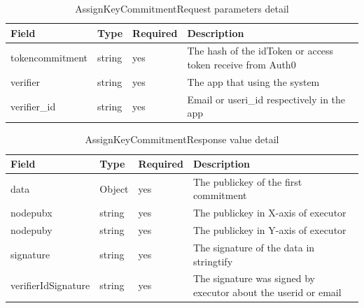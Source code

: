 \documentclass[../Main.tex]{subfiles}
\begin{document}
\begin{table}[H]
  \centering
  \begin{tabular}{|l|l|l|p{8cm}|}
\hline
\rowcolor[HTML]{F56B00} 
\textbf{Field}  & \textbf{Type} & \textbf{Required} & \textbf{Description}                                                    \\ \hline
tokencommitment & string        & yes               & The hash of the idToken or access token receive from Auth0             \\ \hline
verifier        & string        & yes               & The app that using the system\\ \hline
verifier\_id         & string        & yes               & Email or useri\_id respectively in the app\\ \hline
\end{tabular}
  \caption{AssignKeyCommitmentRequest parameters detail}
  \label{assignkey-commitment-request-params-detail}
\end{table}

\begin{table}[H]
  \centering
\begin{tabular}{|l|l|l|l|}
\hline
\rowcolor[HTML]{F56B00} 
\textbf{Field}      & \textbf{Type} & \textbf{Required} & \textbf{Description}                                           \\ \hline
data                & Object        & yes               & The publickey of the first commitment                          \\ \hline
nodepubx            & string        & yes               & The publickey in X-axis of executor                            \\ \hline
nodepuby            & string        & yes               & The publickey in Y-axis of executor                            \\ \hline
signature           & string        & yes               & The signature of the data in stringtify                        \\ \hline
verifierIdSignature & string        & yes               & The signature was signed by executor about the userid or email \\ \hline
\end{tabular}
  \caption{AssignKeyCommitmentResponse value detail}
  \label{assignkey-commitment-response-value-detail}
\end{table}
\end{document}
